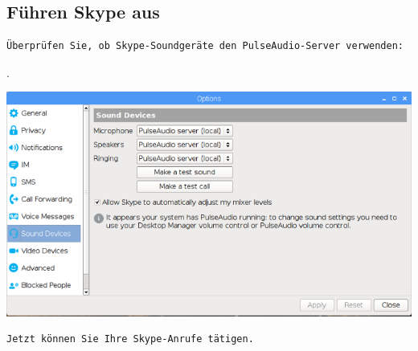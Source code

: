 \subsection{Führen Skype aus}
\begin{verbatim}
Überprüfen Sie, ob Skype-Soundgeräte den PulseAudio-Server verwenden:
\end{verbatim}. 
\begin{minipage}{\textwidth}
    \begin{center}        
        \includegraphics[scale=0.4]{img/skype-option.png} 
    \end{center}
\end{minipage}
\begin{verbatim}
Jetzt können Sie Ihre Skype-Anrufe tätigen.
\end{verbatim}
